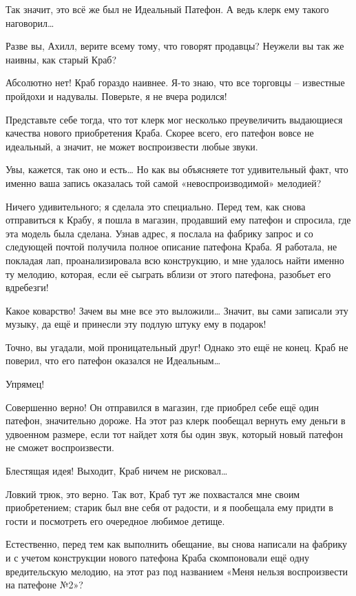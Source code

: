\documentclass[../main.tex]{subfiles}
\begin{document}
\begin{dialogue}
 Так значит, это всё же был не Идеальный Патефон. А ведь клерк ему такого наговорил\ldots{}

 Разве вы, Ахилл, верите всему тому, что говорят продавцы? Неужели вы так же наивны, как старый Краб?

 Абсолютно нет! Краб гораздо наивнее. Я-то знаю, что все торговцы \--- известные пройдохи и надувалы. Поверьте, я не вчера родился!

 Представьте себе тогда, что тот клерк мог несколько преувеличить выдающиеся качества нового приобретения Краба. Скорее всего, его патефон вовсе не идеальный, а значит, не может воспроизвести любые звуки.

 Увы, кажется, так оно и есть\ldots{} Но как вы объясняете тот удивительный факт, что именно ваша запись оказалась той самой «невоспроизводимой» мелодией?

 Ничего удивительного; я сделала это специально. Перед тем, как снова отправиться к Крабу, я пошла в магазин, продавший ему патефон и спросила, где эта модель была сделана. Узнав адрес, я послала на фабрику запрос и со следующей почтой получила полное описание патефона Краба. Я работала, не покладая лап, проанализировала всю конструкцию, и мне удалось найти именно ту мелодию, которая, если её сыграть вблизи от этого патефона, разобьет его вдребезги!

 Какое коварство! Зачем вы мне все это выложили\ldots{} Значит, вы сами записали эту музыку, да ещё и принесли эту подлую штуку ему в подарок!

 Точно, вы угадали, мой проницательный друг! Однако это ещё не конец. Краб не поверил, что его патефон оказался не Идеальным\ldots{}

 Упрямец!

 Совершенно верно! Он отправился в магазин, где приобрел себе ещё один патефон, значительно дороже. На этот раз клерк пообещал вернуть ему деньги в удвоенном размере, если тот найдет хотя бы один звук, который новый патефон не сможет воспроизвести.

 {\Large Б}лестящая идея! Выходит, Краб ничем не рисковал\ldots{}

 Ловкий трюк, это верно. Так вот, Краб тут же похвастался мне своим приобретением; старик был вне себя от радости, и я пообещала ему придти в гости и посмотреть его очередное любимое детище.

 Естественно, перед тем как выполнить обещание, вы снова написали на фабрику и с учетом конструкции нового патефона Краба скомпоновали ещё одну вредительскую мелодию, на этот раз под названием «Меня нельзя воспроизвести на патефоне №2»?


\end{dialogue}
\end{document}
